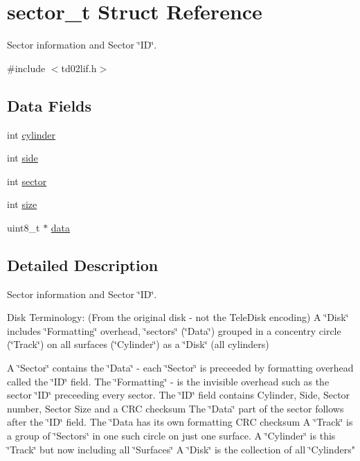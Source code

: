 \hypertarget{structsector__t}{}\section{sector\+\_\+t Struct Reference}
\label{structsector__t}


Sector information and Sector \char`\"{}\+I\+D\char`\"{}.  




{\ttfamily \#include $<$td02lif.\+h$>$}

\subsection*{Data Fields}
\begin{DoxyCompactItemize}
\item 
int \hyperlink{structsector__t_abf5eb245097466ac9624e59a379a2409}{cylinder}
\item 
int \hyperlink{structsector__t_a78a5489776ec87f0146b56bf9ed69ee9}{side}
\item 
int \hyperlink{structsector__t_ac4920b9f7c5e2e9d67f3d2aca7a7191f}{sector}
\item 
int \hyperlink{structsector__t_ab7886bbfbf6610a6324acbff76cd8fe0}{size}
\item 
uint8\+\_\+t $\ast$ \hyperlink{structsector__t_a3a7122a3121eb84094a889be7e6ed042}{data}
\end{DoxyCompactItemize}


\subsection{Detailed Description}
Sector information and Sector \char`\"{}\+I\+D\char`\"{}. 

Disk Terminology\+: (From the original disk -\/ not the Tele\+Disk encoding) A \char`\"{}\+Disk\char`\"{} includes \char`\"{}\+Formatting\char`\"{} overhead, \char`\"{}sectors\char`\"{} (\char`\"{}\+Data\char`\"{}) grouped in a concentry circle (\char`\"{}\+Track\char`\"{}) on all surfaces (\char`\"{}\+Cylinder\char`\"{}) as a \char`\"{}\+Disk\char`\"{} (all cylinders)

A \char`\"{}\+Sector\char`\"{} contains the \char`\"{}\+Data\char`\"{} -\/ each \char`\"{}\+Sector\char`\"{} is preceeded by formatting overhead called the \char`\"{}\+I\+D\char`\"{} field. The \char`\"{}\+Formatting\char`\"{} -\/ is the invisible overhead such as the sector \char`\"{}\+I\+D\char`\"{} preceeding every sector. The \char`\"{}\+I\+D\char`\"{} field contains Cylinder, Side, Sector number, Sector Size and a C\+RC checksum The \char`\"{}\+Data\char`\"{} part of the sector follows after the \char`\"{}\+I\+D\char`\"{} field. The \char`\"{}\+Data has its own formatting C\+R\+C checksum
     A \char`\"{}Track\char`\"{} is a group of \char`\"{}Sectors\char`\"{} in one such circle on just one surface. 
     A \char`\"{}Cylinder\char`\"{} is this \char`\"{}Track\char`\"{} but now including all \char`\"{}Surfaces\char`\"{}
     A \char`\"{}Disk\char`\"{} is the collection of all \char`\"{}Cylinders"

